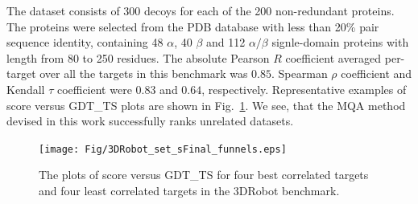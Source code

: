The dataset consists of 300 decoys for each of the 200 non-redundant proteins. The proteins were 
selected from the PDB database with less than 20\% pair sequence identity, containing 48 $\alpha$, 
40 $\beta$ and 112 $\alpha/\beta$ signle-domain proteins with length from 80 to 250 residues. 
The absolute Pearson $R$ coefficient averaged per-target over all the
targets in this benchmark was $0.85$. Spearman $\rho$ coefficient
and Kendall $\tau$ coefficient were $0.83$ and $0.64$, respectively.
Representative examples of score versus GDT\_TS plots are shown in
Fig.~\ref{Fig:3DRobotBenchmark}.  We see, that the MQA method devised
in this work successfully ranks unrelated datasets.
\begin{figure}[H]
    \centering
    \texttt{[image: Fig/3DRobot\_set\_sFinal\_funnels.eps]}
%
    \caption{The plots of score versus GDT\_TS for four best correlated targets and four
    least correlated targets in the 3DRobot benchmark.}
    \label{Fig:3DRobotBenchmark}
\end{figure}
